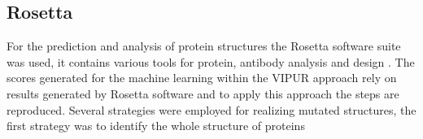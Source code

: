 %
%
%

\subsection{Rosetta}
For the prediction and analysis of protein structures the Rosetta software suite was used, it contains various tools for protein, antibody analysis and design \cite{}.
The scores generated for the machine learning within the VIPUR approach rely on results generated by Rosetta software and to apply this approach the steps are reproduced.  
Several strategies were employed for realizing mutated structures, the first strategy was to identify the whole structure of proteins



